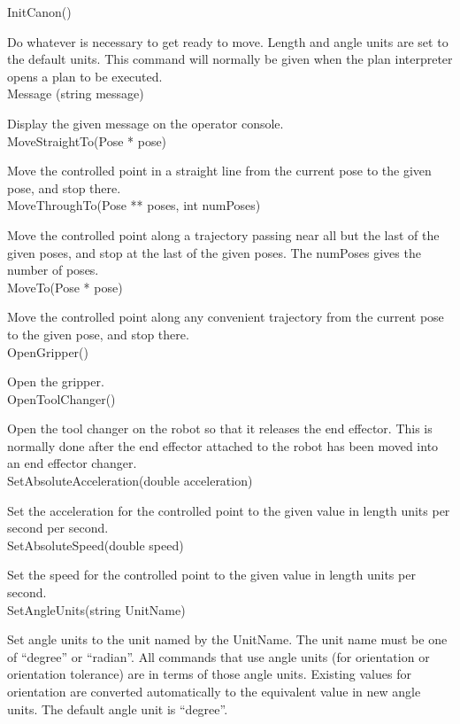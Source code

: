 \sf InitCanon()\rm

Do whatever is necessary to get ready to move. Length and angle units
are set to the default units. This command will normally be given when
the plan interpreter opens a plan to be executed.\\

\sf Message (string message)\rm

Display the given message on the operator console.\\

\sf MoveStraightTo(Pose * pose)\rm

Move the controlled point in a straight line from the current pose to
the given pose, and stop there.\\

\sf MoveThroughTo(Pose ** poses, int numPoses)\rm

Move the controlled point along a trajectory passing near all but
the last of the given poses, and stop at the last of the given poses.
The numPoses gives the number of poses.\\

\sf MoveTo(Pose * pose)\rm

Move the controlled point along any convenient trajectory from the
current pose to the given pose, and stop there.\\

\sf OpenGripper()\rm

Open the gripper.\\

\sf OpenToolChanger()\rm

Open the tool changer on the robot so that it releases the end effector.
This is normally done after the end effector attached to the robot has
been moved into an end effector changer.\\

\sf SetAbsoluteAcceleration(double acceleration)\rm

Set the acceleration for the controlled point to the given value in
length units per second per second.\\

\sf SetAbsoluteSpeed(double speed)\rm

Set the speed for the controlled point to the given value in length units
per second.\\

\sf SetAngleUnits(string UnitName)\rm

Set angle units to the unit named by the UnitName.
The unit name must be one of ``degree'' or ``radian''. All commands that
use angle units (for orientation or orientation tolerance) are
in terms of those angle units. Existing values for orientation are
converted automatically to the equivalent value in new angle units.
The default angle unit is ``degree''.\\

